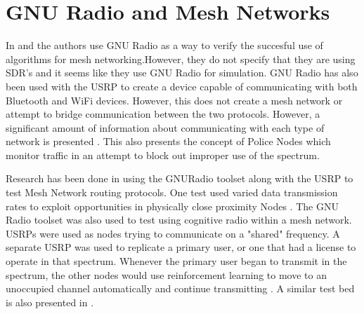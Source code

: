 \section{GNU Radio and Mesh Networks}

In \cite{4509617} and \cite{5062250} the authors use GNU Radio as a way to verify the succesful use of algorithms for mesh 
networking.However, they do not specify that they are using SDR's and it seems like they use GNU Radio for simulation. GNU Radio has
also been used with the USRP to create a device capable of communicating with both Bluetooth and WiFi devices. However, this does not
create a mesh network or attempt to bridge communication between the two protocols. However, a significant amount of information about
communicating with each type of network is presented \cite{4292880}. This also presents the concept of Police Nodes which monitor
traffic in an attempt to block out improper use of the spectrum. 

Research has been done in using the GNURadio toolset along with the USRP to test Mesh Network routing protocols. One test 
used varied data transmission rates to exploit opportunities in physically close proximity Nodes \cite{5462112}. The GNU Radio 
toolset was also used to test using cognitive radio within a mesh network. USRPs were used as nodes trying to communicate on a
"shared" frequency. A separate USRP was used to replicate a primary user, or one that had a license to operate in that spectrum. 
Whenever the primary user began to transmit in the spectrum, the other nodes would use reinforcement learning to move to an 
unoccupied channel automatically and continue transmitting \cite{7141228}. A similar test bed is also presented in \cite{5508221}.
 
